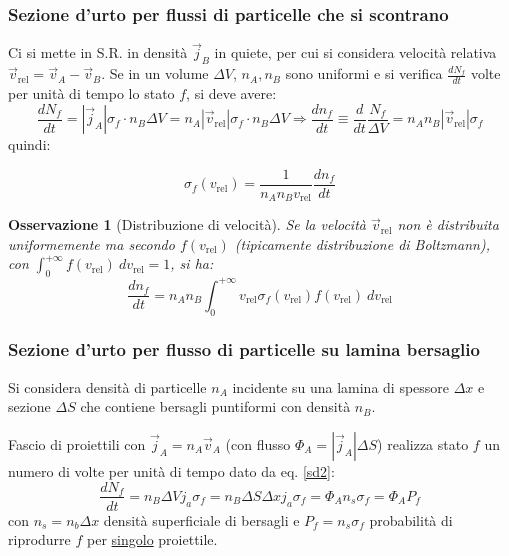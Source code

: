 \documentclass[10pt, a4paper]{scrartcl}
\numberwithin{equation}{subsection}
\theoremstyle{style1}
\newtheorem{osservazione}{Osservazione}[section]
\newenvironment{boxenv}[1][]{
    \begin{eqbox}[#1]
    }{
   \end{eqbox}
}
\begin{document}
\subsubsection{Sezione d'urto per flussi di particelle che si scontrano}
Ci si mette in S.R. in densit\`a $\vec{j}_B$ in quiete, per cui si considera velocit\`a relativa $\vec{v}_\text{rel}= \vec{v}_A - \vec{v}_B$. Se in un volume $\Delta V$, $n_A,n_B$ sono uniformi e si verifica $\frac{d N_f}{d t} $ volte per unit\`a di tempo lo stato $f$, si deve avere:
\begin{equation}\label{sd2}
	\frac{d N_f}{d t}  = |\vec{j}_A| \sigma _f \cdot n_B \Delta V = n_A|\vec{v}_\text{rel}| \sigma _f \cdot n_B\Delta V \Rightarrow \frac{d n_f}{d t} \equiv \frac{d }{d t} \frac{N_f}{\Delta V} = n_A n_B |\vec{v}_\text{rel}| \sigma _f
\end{equation}
quindi:
\begin{boxenv}[]
\begin{equation}
	\sigma _f(v_\text{rel}) = \frac{1}{n_A n_B v_\text{rel}} \frac{d n_f}{d t} 
\end{equation}
\end{boxenv}
\begin{osservazione}
	[Distribuzione di velocit\`a]
	Se la velocit\`a $\vec{v}_\text{rel}$ non \`e distribuita uniformemente ma secondo $f(v_\text{rel})$ (tipicamente distribuzione di Boltzmann), con $\int_{0} ^{+\infty} f(v_\text{rel}) \ dv_\text{rel} = 1$, si ha:
	\begin{equation}
		\frac{d n_f}{d t} = n_An_B \int_{0} ^{+\infty} v_\text{rel}\sigma _f(v_\text{rel}) f(v_\text{rel}) \ dv_\text{rel}
	\end{equation}
\end{osservazione}
\subsubsection{Sezione d'urto per flusso di particelle su lamina bersaglio}
Si considera densit\`a di particelle $n_A$ incidente su una lamina di spessore $\Delta x$ e sezione $\Delta S$ che contiene bersagli puntiformi con densit\`a $n_B$.

Fascio di proiettili con $\vec{j}_A = n_A \vec{v}_A$ (con flusso $\Phi_A = |\vec{j}_A| \Delta S$) realizza stato $f$ un numero di volte per unit\`a di tempo dato da eq. \ref{sd2}:
\begin{equation}\label{eqsd3}
	\frac{d N_f}{d t} = n_B \Delta V j_a \sigma _f = n_B \Delta S \Delta x j_a \sigma _f = \Phi_A n_s \sigma _f = \Phi_A P_f
\end{equation}
con $n_s = n_b \Delta x$ densit\`a superficiale di bersagli e $P_f=n_s \sigma _f$ probabilit\`a di riprodurre $f$ per \underline{singolo} proiettile.
\end{document}
